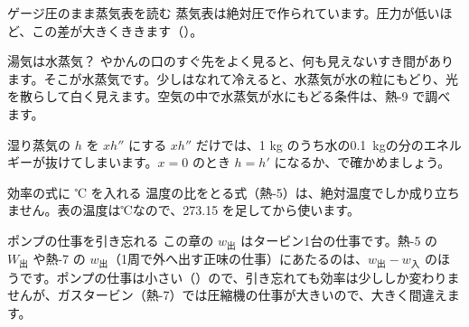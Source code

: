 \begin{tsumazuki}{ゲージ圧のまま蒸気表を読む}
蒸気表は絶対圧で作られています。圧力が低いほど、この差が大きくききます（）。
\end{tsumazuki}
\begin{tsumazuki}{湯気は水蒸気？}
やかんの口のすぐ先をよく見ると、何も見えないすき間があります。そこが水蒸気です。少しはなれて冷えると、水蒸気が水の粒にもどり、光を散らして白く見えます。空気の中で水蒸気が水にもどる条件は、熱-9 で調べます。
\end{tsumazuki}
\begin{tsumazuki}{湿り蒸気の $h$ を $xh''$ にする}
$xh''$ だけでは、1 kg のうち水の\qty{0.1}{kg}の分のエネルギーが抜けてしまいます。$x=0$ のとき $h=h'$ になるか、で確かめましょう。
\end{tsumazuki}
\begin{tsumazuki}{効率の式に ℃ を入れる}
温度の比をとる式（熱-5）は、絶対温度でしか成り立ちません。表の温度は℃なので、273.15 を足してから使います。
\end{tsumazuki}
\begin{tsumazuki}{ポンプの仕事を引き忘れる}
この章の $w_{\text{出}}$ はタービン1台の仕事です。熱-5 の $W_{\text{出}}$ や熱-7 の $w_{\text{出}}$（1周で外へ出す正味の仕事）にあたるのは、$w_{\text{出}}-w_{\text{入}}$ のほうです。ポンプの仕事は小さい（）ので、引き忘れても効率は少ししか変わりませんが、ガスタービン（熱-7）では圧縮機の仕事が大きいので、大きく間違えます。
\end{tsumazuki}

